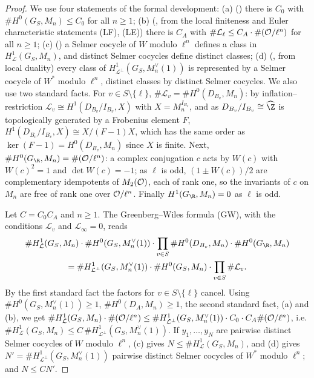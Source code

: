 \begin{proof}
We use four statements of the formal development:
(a) () there is $C_0$ with $\#H^0(G_S,M_n)\le C_0$
for all $n\ge1$;
(b) (, from the local finiteness and Euler
characteristic statements (LF), (LE)) there is $C_A$ with $\#\mathcal L_\ell\le C_A\cdot\#(\mathcal{O}/\ell^n)$ for all $n\ge1$;
(c) () a Selmer cocycle of $W$ modulo $\ell^n$ defines a class in
$H^1_{\mathcal L}(G_S,M_n)$, and distinct Selmer cocycles define distinct classes;
(d) (, from local duality) every class of
$H^1_{\mathcal L^\perp}(G_S,M_n^\vee(1))$ is represented by a Selmer cocycle of $W^*$ modulo $\ell^n$, distinct classes by distinct
Selmer cocycles.
We also use two standard facts. For $v\in S\setminus\{\ell\}$, $\#\mathcal L_v=\#H^0(D_{B_v},M_n)$: by inflation--restriction $\mathcal L_v\cong
H^1(D_{B_v}/I_{B_v},X)$ with $X=M_n^{I_{B_v}}$, and as $D_{B_v}/I_{B_v}\cong\widehat\Z$ is topologically generated by a Frobenius element $F$,
$H^1(D_{B_v}/I_{B_v},X)\cong X/(F-1)X$, which has the same order as $\ker(F-1)=H^0(D_{B_v},M_n)$ since $X$ is finite. Next,
$\#H^0(G_\R,M_n)=\#(\katoO/\ell^n)$: a complex conjugation $c$ acts by $W(c)$ with $W(c)^2=1$ and $\det W(c)=-1$; as $\ell$ is odd,
$(1\pm W(c))/2$ are complementary idempotents of $M_2(\mathcal{O})$, each of rank one, so the invariants of $c$ on $M_n$ are free of rank one
over $\mathcal{O}/\ell^n$. Finally $H^1(G_\R,M_n)=0$ as $\ell$ is odd.

Let $C=C_0C_A$ and $n\ge1$. The Greenberg--Wiles formula (GW), with the conditions $\mathcal L_v$ and $\mathcal L_\infty=0$, reads
\begin{multline*}
  \#H^1_{\mathcal L}(G_S,M_n)\cdot\#H^0(G_S,M_n^\vee(1))\cdot\prod_{v\in S}\#H^0(D_{B_v},M_n)\cdot\#H^0(G_\R,M_n)\\
  =\#H^1_{\mathcal L^\perp}(G_S,M_n^\vee(1))\cdot\#H^0(G_S,M_n)\cdot\prod_{v\in S}\#\mathcal L_v .
\end{multline*}
By the first standard fact the factors for $v\in S\setminus\{\ell\}$ cancel. Using $\#H^0(G_S,M_n^\vee(1))\ge1$, $\#H^0(D_A,M_n)\ge1$, the
second standard fact, (a) and (b), we get
$\#H^1_{\mathcal L}(G_S,M_n)\cdot\#(\mathcal{O}/\ell^n)\le\#H^1_{\mathcal L^\perp}(G_S,M_n^\vee(1))\cdot C_0\cdot C_A\#(\mathcal{O}/\ell^n)$, i.e.
$\#H^1_{\mathcal L}(G_S,M_n)\le C\,\#H^1_{\mathcal L^\perp}(G_S,M_n^\vee(1))$. If $y_1,\dots,y_N$ are pairwise distinct Selmer cocycles of $W$
modulo $\ell^n$, (c) gives $N\le\#H^1_{\mathcal L}(G_S,M_n)$, and (d) gives $N'=\#H^1_{\mathcal L^\perp}(G_S,M_n^\vee(1))$ pairwise
distinct Selmer cocycles of $W^*$ modulo $\ell^n$; and $N\le CN'$.
\end{proof}

